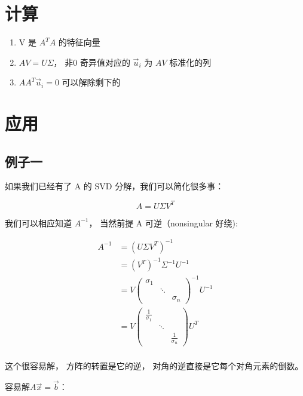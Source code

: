 \documentclass[
]{book}
\providecommand{\tightlist}{%
  \setlength{\itemsep}{0pt}\setlength{\parskip}{0pt}}
\begin{document}
\hypertarget{ux8ba1ux7b97-4}{%
\section{计算}\label{ux8ba1ux7b97-4}}

\begin{enumerate}
\def\labelenumi{\arabic{enumi}.}
\tightlist
\item
  V 是 \(A^TA\) 的特征向量
\item
  \(AV = U \Sigma\)， 非0 奇异值对应的 \(\vec{u}_i\) 为 \(AV\) 标准化的列
\item
  \(AA^T\vec{u}_i = 0\) 可以解除剩下的
\end{enumerate}

\hypertarget{ux5e94ux7528}{%
\section{应用}\label{ux5e94ux7528}}

\hypertarget{ux4f8bux5b50ux4e00}{%
\subsection{例子一}\label{ux4f8bux5b50ux4e00}}

如果我们已经有了 A 的 SVD 分解，我们可以简化很多事：

\[A = U \Sigma V^T\]

我们可以相应知道 \(A^{-1}\)， 当然前提 A 可逆（nonsingular 好绕):

\[
\begin{aligned}
A^{-1} {}
&=  (U \Sigma V^T)^{-1} \\
&= (V^T)^{-1} \Sigma^{-1} U^{-1} \\
&= V \begin{pmatrix} \sigma_1  & & \\ & \ddots &  \\  & & \sigma_n \end{pmatrix}^{-1} U^{-1} \\
&= V \begin{pmatrix} \frac{1}{\sigma_1}  & & \\ & \ddots &  \\  & & \frac{1}{\sigma_n} \end{pmatrix} U^T \\
\end{aligned}
\]

这个很容易解， 方阵的转置是它的逆， 对角的逆直接是它每个对角元素的倒数。

容易解\(A\vec{x}= \vec{b}\)：
\end{document}
